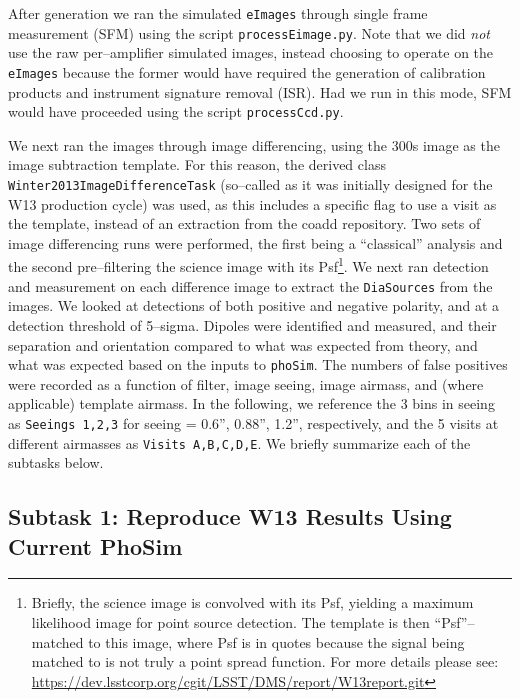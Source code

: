 \documentclass[prd, nofootinbib, floatfix, 11pt, tightenlines, times]{article}
\begin{document}
After generation we ran the simulated {\tt eImages} through single
frame measurement (SFM) using the script {\tt processEimage.py}.  Note
that we did {\it not} use the raw per--amplifier simulated images,
instead choosing to operate on the {\tt eImages} because the former
would have required the generation of calibration products and
instrument signature removal (ISR).  Had we run in this mode, SFM
would have proceeded using the script {\tt processCcd.py}.

We next ran the images through image differencing, using the 300s
image as the image subtraction template.  For this reason, the derived
class {\tt Winter2013ImageDifferenceTask} (so--called as it was
initially designed for the W13 production cycle) was used, as this
includes a specific flag to use a visit as the template, instead of an
extraction from the coadd repository.  Two sets of image differencing
runs were performed, the first being a ``classical'' analysis and the
second pre--filtering the science image with its Psf\footnote{Briefly,
  the science image is convolved with its Psf, yielding a maximum
  likelihood image for point source detection.  The template is then
  ``Psf''--matched to this image, where Psf is in quotes because the
  signal being matched to is not truly a point spread function.  For
  more details please see:
  \url{https://dev.lsstcorp.org/cgit/LSST/DMS/report/W13report.git}}.
We next ran detection and measurement on each difference image to
extract the {\tt DiaSources} from the images.  We looked at detections
of both positive and negative polarity, and at a detection threshold
of 5--sigma.  Dipoles were identified and measured, and their
separation and orientation compared to what was expected from theory,
and what was expected based on the inputs to {\tt phoSim}.  The
numbers of false positives were recorded as a function of filter,
image seeing, image airmass, and (where applicable) template airmass.
In the following, we reference the 3 bins in seeing as {\tt Seeings
  1,2,3} for seeing = 0.6'', 0.88'', 1.2'', respectively, and the 5
visits at different airmasses as {\tt Visits A,B,C,D,E}.  We briefly
summarize each of the subtasks below.

\subsection{Subtask 1: Reproduce W13 Results Using Current PhoSim}
\end{document}
